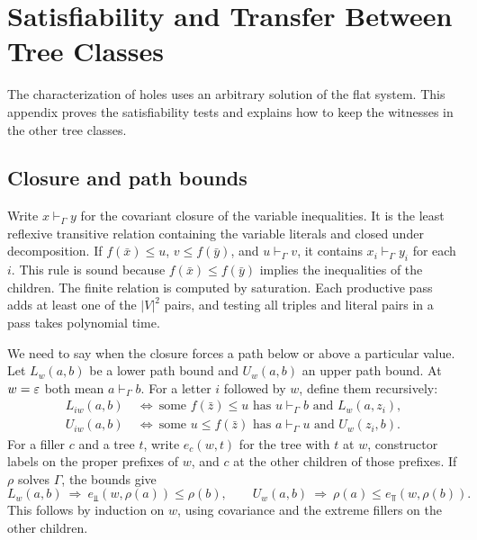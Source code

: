 \section{Satisfiability and Transfer Between Tree Classes}
\label{app:classes}

The characterization of holes uses an arbitrary solution of the flat
system. This appendix proves the satisfiability tests and explains how
to keep the witnesses in the other tree classes.

\subsection{Closure and path bounds}
\label{app:shape}

Write $x\vdash_\Gamma y$ for the covariant closure of the variable
inequalities. It is the least reflexive transitive relation containing
the variable literals and closed under decomposition. If
$f(\bar x)\le u$, $v\le f(\bar y)$, and $u\vdash_\Gamma v$, it contains
$x_i\vdash_\Gamma y_i$ for each $i$. This rule is sound because
$f(\bar x)\le f(\bar y)$ implies the inequalities of the children.
The finite relation is computed by saturation. Each productive pass
adds at least one of the $|V|^2$ pairs, and testing all triples
and literal pairs in a pass takes polynomial time.

We need to say when the closure forces a path below or above a
particular value. Let $L_w(a,b)$ be a lower path bound and $U_w(a,b)$
an upper path bound. At $w=\varepsilon$ both mean $a\vdash_\Gamma b$.
For a letter $i$ followed by $w$, define them recursively:
\begin{align*}
 L_{iw}(a,b)&\ \Longleftrightarrow\
 \text{some }f(\bar z)\le u\text{ has }u\vdash_\Gamma b
             \text{ and } L_w(a,z_i),\\
 U_{iw}(a,b)&\ \Longleftrightarrow\
 \text{some }u\le f(\bar z)\text{ has }a\vdash_\Gamma u
             \text{ and } U_w(z_i,b).
\end{align*}
For a filler $c$ and a tree $t$, write $e_c(w,t)$ for the tree with
$t$ at $w$, constructor labels on the proper prefixes of $w$, and
$c$ at the other children of those prefixes. If $\rho$ solves $\Gamma$,
the bounds give
\[
 L_w(a,b)\ \Longrightarrow\ e_\Bot(w,\rho(a))\le\rho(b),
 \qquad
 U_w(a,b)\ \Longrightarrow\ \rho(a)\le e_\Top(w,\rho(b)).
\]
This follows by induction on $w$, using covariance and the extreme
fillers on the other children.


